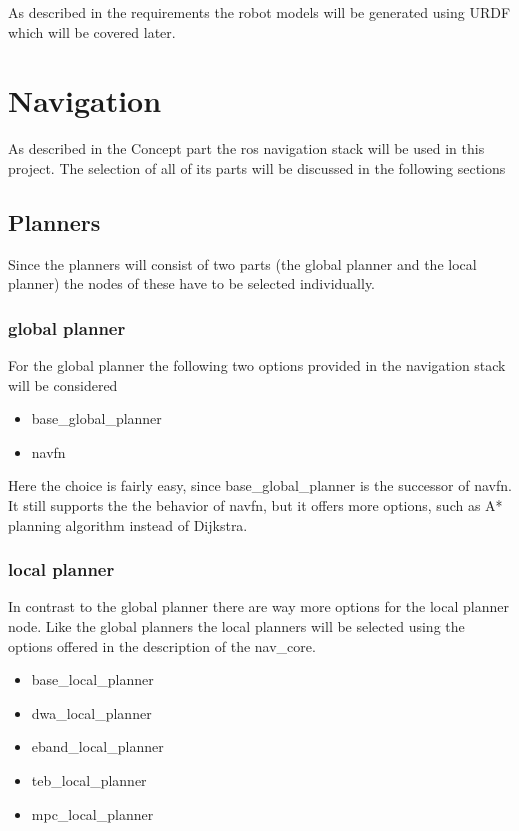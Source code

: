As described in the requirements the robot models will be generated using URDF which will be covered later.

\section{Navigation}

As described in the Concept part the ros navigation stack will be used in this project.
The selection of all of its parts will be discussed in the following sections

\subsection{Planners}
Since the planners will consist of two parts (the global planner and the local planner) the nodes of these have to be selected individually.

\subsubsection{global planner}
For the global planner the following two options provided in the navigation stack will be considered 

\begin{itemize}
	\item base\_global\_planner
	\item navfn
\end{itemize}


Here the choice is fairly easy, since base\_global\_planner is the successor of navfn. It still supports the the behavior of navfn, but it offers more options, such as A* planning algorithm instead of Dijkstra.



\subsubsection{local planner}
In contrast to the global planner there are way more options for the local planner node. Like the global planners the local planners will be selected using the options offered in the description of the nav\_core.

\begin{itemize}
	\item base\_local\_planner
	\item dwa\_local\_planner
	\item eband\_local\_planner
	\item teb\_local\_planner
	\item mpc\_local\_planner
\end{itemize}\cite{navcore}


